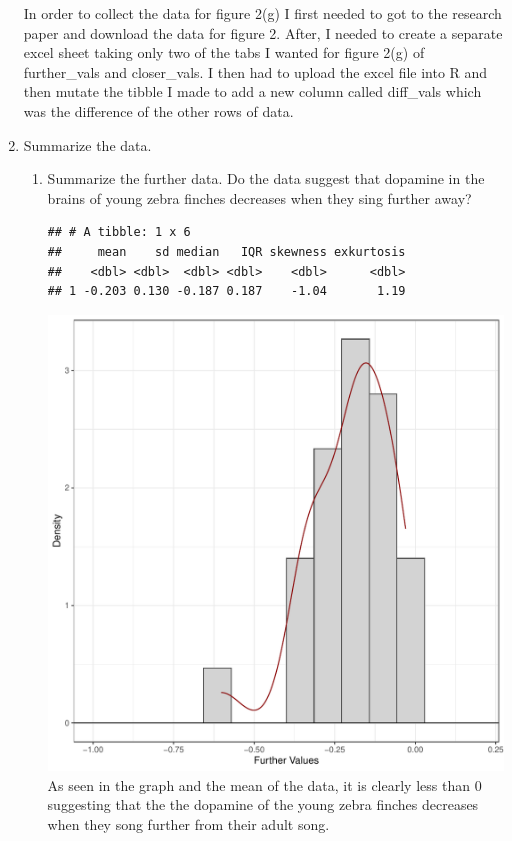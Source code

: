 \documentclass{article}\usepackage[]{graphicx}\usepackage[]{xcolor}
\makeatletter
\def\maxwidth{ %
  \ifdim\Gin@nat@width>\linewidth
    \linewidth
  \else
    \Gin@nat@width
  \fi
}
\newenvironment{kframe}{%
 \def\at@end@of@kframe{}%
 \ifinner\ifhmode%
  \def\at@end@of@kframe{\end{minipage}}%
  \begin{minipage}{\columnwidth}%
 \fi\fi%
 \def\FrameCommand##1{\hskip\@totalleftmargin \hskip-\fboxsep
 \colorbox{shadecolor}{##1}\hskip-\fboxsep
     \hskip-\linewidth \hskip-\@totalleftmargin \hskip\columnwidth}%
 \MakeFramed {\advance\hsize-\width
   \@totalleftmargin\z@ \linewidth\hsize
   \@setminipage}}%
 {\par\unskip\endMakeFramed%
 \at@end@of@kframe}
\newenvironment{knitrout}{}{} %
\makeatother
\begin{document}
\begin{enumerate}
In order to collect the data for figure 2(g) I first needed to got to the research paper \citep{Kasdin25} and download the data for figure 2. After, I needed to create a separate excel sheet taking only two of the tabs I wanted for figure 2(g) of further\_vals and closer\_vals. I then had to upload the excel file into R and then mutate the tibble I made to add a new column called diff\_vals which was the difference of the other rows of data.
\item Summarize the data.
\begin{enumerate}
  \item Summarize the further data. Do the data suggest that
   dopamine in the brains of young zebra finches decreases when
   they sing further away?
\begin{knitrout}
\color{fgcolor}\begin{kframe}
\begin{verbatim}
## # A tibble: 1 x 6
##     mean    sd median   IQR skewness exkurtosis
##    <dbl> <dbl>  <dbl> <dbl>    <dbl>      <dbl>
## 1 -0.203 0.130 -0.187 0.187    -1.04       1.19
\end{verbatim}
\end{kframe}
\end{knitrout}

\begin{knitrout}
\color{fgcolor}
\includegraphics[width=\maxwidth]{figure/unnamed-chunk-5-1} 
\end{knitrout}
As seen in the graph and the mean of the data, it is clearly less than 0 suggesting that the the dopamine of the young zebra finches decreases when they song further from their adult song.


\end{enumerate}
\end{enumerate}
\end{document}
